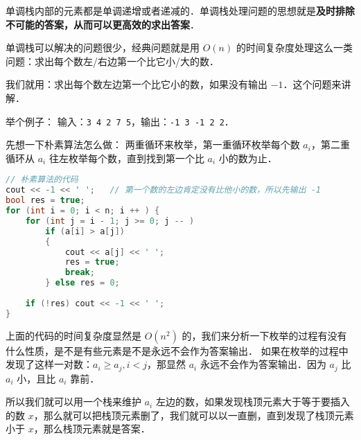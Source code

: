 

单调栈内部的元素都是单调递增或者递减的．单调栈处理问题的思想就是\textbf{及时排除不可能的答案，从而可以更高效的求出答案}．

单调栈可以解决的问题很少，经典问题就是用 $O(n)$ 的时间复杂度处理这么一类问题：求出每个数左/右边第一个比它小/大的数．

我们就用：求出每个数左边第一个比它小的数，如果没有输出 $-1$．这个问题来讲解．

举个例子：
输入：\verb|3 4 2 7 5|，输出：\verb|-1 3 -1 2 2|．

先想一下朴素算法怎么做：
两重循环来枚举，第一重循环枚举每个数 $a_i$，第二重循环从 $a_i$ 往左枚举每个数，直到找到第一个比 $a_i$ 小的数为止．

\begin{lstlisting}[language=cpp]
// 朴素算法的代码
cout << -1 << ' ';   // 第一个数的左边肯定没有比他小的数，所以先输出 -1
bool res = true;
for (int i = 0; i < n; i ++ ) {
    for (int j = i - 1; j >= 0; j -- )
        if (a[i] > a[j])
        {
            cout << a[j] << ' ';
            res = true;
            break;
        } else res = 0;
    
    if (!res) cout << -1 << ' ';
}
\end{lstlisting}

上面的代码的时间复杂度显然是 $O(n^2)$ 的，我们来分析一下枚举的过程有没有什么性质，是不是有些元素是不是永远不会作为答案输出．
如果在枚举的过程中发现了这样一对数：$a_i \geqslant a_j, i < j$，那显然 $a_i$ 永远不会作为答案输出．因为 $a_j$ 比 $a_i$ 小，且比 $a_i$ 靠前．

所以我们就可以用一个栈来维护 $a_i$ 左边的数，如果发现栈顶元素大于等于要插入的数 $x$，那么就可以把栈顶元素删了，我们就可以以一直删，直到发现了栈顶元素小于 $x$，那么栈顶元素就是答案．